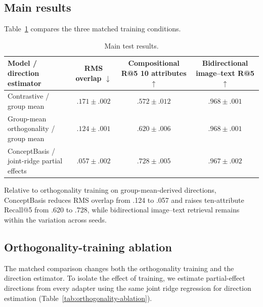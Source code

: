 \documentclass[mlmain,onecolumn]{jmlr}
\begin{document}
\subsection{Main results}

Table~\ref{tab:main-results} compares the three matched training conditions.

\begin{table}[h!]
  \centering
  \caption{Main test results.}
  \label{tab:main-results}
  \small
  \begin{tabular}{@{}p{} c c c@{}}
    \toprule
    Model / direction estimator &
    \shortstack{RMS\\overlap $\downarrow$} &
    \shortstack{Compositional R@5\\10 attributes $\uparrow$} &
    \shortstack{Bidirectional\\image--text R@5 $\uparrow$} \\
    \midrule
    Contrastive / group mean
      & $.171 \pm .002$ & $.572 \pm .012$ & $.968 \pm .001$ \\
    Group-mean orthogonality / group mean
      & $.124 \pm .001$ & $.620 \pm .006$ & $.968 \pm .001$ \\
    ConceptBasis / joint-ridge partial effects
      & $\mathbf{.057 \pm .002}$ & $\mathbf{.728 \pm .005}$ & $.967 \pm .002$ \\
    \bottomrule
  \end{tabular}
\end{table}

Relative to orthogonality training on group-mean-derived directions, ConceptBasis reduces RMS overlap from .124 to .057 and raises ten-attribute Recall@5 from .620 to .728, while bidirectional image--text retrieval remains within the variation across seeds.

\subsection{Orthogonality-training ablation}

The matched comparison changes both the orthogonality training and the direction estimator. To isolate the effect of training, we estimate partial-effect directions from every adapter using the same joint ridge regression for direction estimation (Table~\ref{tab:orthogonality-ablation}).
\end{document}
